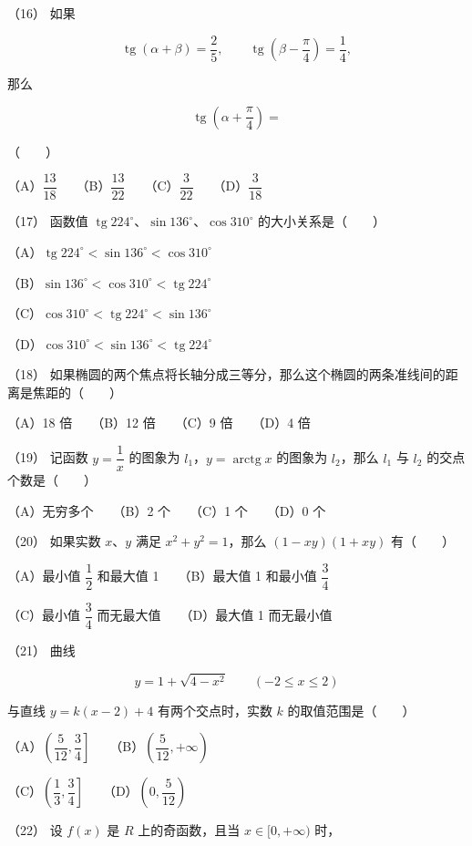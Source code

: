 \begin{question}
（16） 如果

\nopagebreak[4]
\[
\operatorname{tg}(\alpha+\beta)=\frac25,
\qquad \operatorname{tg}\left(\beta-\frac\pi4\right)=\frac14,
\]

那么

\nopagebreak[4]
\[
\operatorname{tg}\left(\alpha+\frac\pi4\right)=
\]

\mbox{（　　）}

（A）$\dfrac{13}{18}$　　（B）$\dfrac{13}{22}$　　（C）$\dfrac3{22}$　　（D）$\dfrac3{18}$

（17） 函数值 $\operatorname{tg}224^\circ\text{、}\sin136^\circ\text{、}\cos310^\circ$ 的大小关系是\mbox{（　　）}

（A）$\operatorname{tg}224^\circ<\sin136^\circ<\cos310^\circ$

（B）$\sin136^\circ<\cos310^\circ<\operatorname{tg}224^\circ$

（C）$\cos310^\circ<\operatorname{tg}224^\circ<\sin136^\circ$

（D）$\cos310^\circ<\sin136^\circ<\operatorname{tg}224^\circ$

（18） 如果椭圆的两个焦点将长轴分成三等分，那么这个椭圆的两条准线间的距离是焦距的\mbox{（　　）}

（A）18 倍　　（B）12 倍　　（C）9 倍　　（D）4 倍

（19） 记函数 $y=\dfrac1x$ 的图象为 $l_1$，$y=\operatorname{arctg} x$ 的图象为 $l_2$，那么 $l_1$ 与 $l_2$ 的交点个数是\mbox{（　　）}

（A）无穷多个　　（B）2 个　　（C）1 个　　（D）0 个

（20） 如果实数 $x\text{、}y$ 满足 $x^2+y^2=1$，那么 $(1-xy)(1+xy)$ 有\mbox{（　　）}

（A）最小值 $\dfrac12$ 和最大值 1　　（B）最大值 1 和最小值 $\dfrac34$

（C）最小值 $\dfrac34$ 而无最大值　　（D）最大值 1 而无最小值

（21） 曲线

\nopagebreak[4]
\[
y=1+\sqrt{4-x^2}\qquad(-2\leq x\leq2)
\]

与直线 $y=k(x-2)+4$ 有两个交点时，实数 $k$ 的取值范围是\mbox{（　　）}

（A）$\left(\dfrac5{12},\dfrac34\right]$　　（B）$\left(\dfrac5{12},+\infty\right)$

（C）$\left(\dfrac13,\dfrac34\right]$　　（D）$\left(0,\dfrac5{12}\right)$

（22） 设 $f(x)$ 是 $R$ 上的奇函数，且当 $x\in[0,+\infty)$ 时，


\end{question}
